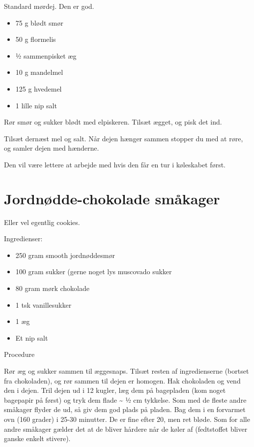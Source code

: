 \documentclass[
  letterpaper,
  DIV=11,
  numbers=noendperiod]{scrreprt}
\providecommand{\tightlist}{%
  \setlength{\itemsep}{0pt}\setlength{\parskip}{0pt}}\usepackage{longtable,booktabs,array}
\begin{document}
Standard mørdej. Den er god.

\begin{itemize}
\tightlist
\item
  75 g blødt smør
\item
  50 g flormelis
\item
  1⁄2 sammenpisket æg
\item
  10 g mandelmel
\item
  125 g hvedemel
\item
  1 lille nip salt
\end{itemize}

Rør smør og sukker blødt med elpiskeren. Tilsæt ægget, og pisk det ind.

Tilsæt dernæst mel og salt. Når dejen hænger sammen stopper du med at
røre, og samler dejen med hænderne.

Den vil være lettere at arbejde med hvis den får en tur i køleskabet
først.

\hypertarget{jordnuxf8dde-chokolade-smuxe5kager-1}{%
\section{Jordnødde-chokolade
småkager}\label{jordnuxf8dde-chokolade-smuxe5kager-1}}

Eller vel egentlig cookies.

Ingredienser:

\begin{itemize}
\tightlist
\item
  250 gram smooth jordnøddesmør
\item
  100 gram sukker (gerne noget lys muscovado sukker
\item
  80 gram mørk chokolade
\item
  1 tsk vanillesukker
\item
  1 æg
\item
  Et nip salt
\end{itemize}

Procedure

Rør æg og sukker sammen til æggesnaps. Tilsæt resten af ingredienserne
(bortset fra chokoladen), og rør sammen til dejen er homogen. Hak
chokoladen og vend den i dejen. Tril dejen ud i 12 kugler, læg dem på
bagepladen (kom noget bagepapir på først) og tryk dem flade
\textasciitilde{} ½ cm tykkelse. Som med de fleste andre småkager flyder
de ud, så giv dem god plads på pladen. Bag dem i en forvarmet ovn (160
grader) i 25-30 minutter. De er fine efter 20, men ret bløde. Som for
alle andre småkager gælder det at de bliver hårdere når de køler af
(fedtstoffet bliver ganske enkelt stivere).
\end{document}
